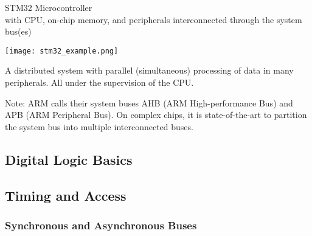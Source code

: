 \begin{example2}{STM32 Microcontroller}\\
    with CPU, on-chip memory, and peripherals interconnected through the system bus(es)

    \texttt{[image: stm32\_example.png]}

    A distributed system with parallel (simultaneous) processing of data in many peripherals. All under the supervision of the CPU.
\end{example2}

\begin{remark}
    Note: ARM calls their system buses AHB (ARM High-performance Bus) and APB (ARM
    Peripheral Bus). On complex chips, it is state-of-the-art to partition the system bus into
    multiple interconnected buses.
\end{remark}

\pagebreak



\subsection{Digital Logic Basics}
\multend

\pagebreak

\subsection{Timing and Access}

\subsubsection{Synchronous and Asynchronous Buses}

